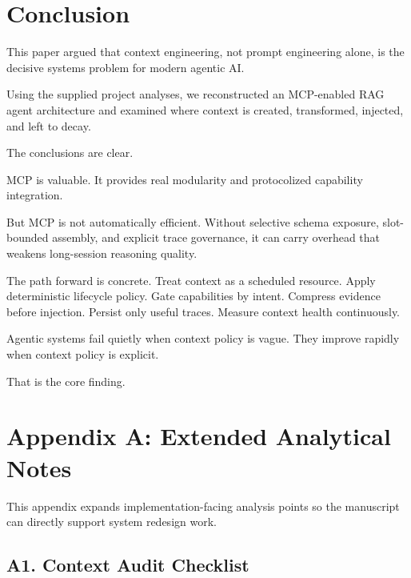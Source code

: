 \documentclass[conference]{IEEEtran}
\begin{document}
\section{Conclusion}
\label{sec:conclusion}

This paper argued that context engineering,
not prompt engineering alone,
is the decisive systems problem for modern agentic AI.

Using the supplied project analyses,
we reconstructed an MCP-enabled RAG agent architecture and examined where context is created,
transformed,
injected,
and left to decay.

The conclusions are clear.

MCP is valuable.
It provides real modularity and protocolized capability integration.

But MCP is not automatically efficient.
Without selective schema exposure,
slot-bounded assembly,
and explicit trace governance,
it can carry overhead that weakens long-session reasoning quality.

The path forward is concrete.
Treat context as a scheduled resource.
Apply deterministic lifecycle policy.
Gate capabilities by intent.
Compress evidence before injection.
Persist only useful traces.
Measure context health continuously.

Agentic systems fail quietly when context policy is vague.
They improve rapidly when context policy is explicit.

That is the core finding.

\section*{Appendix A: Extended Analytical Notes}

This appendix expands implementation-facing analysis points so the manuscript can directly support system redesign work.

\subsection*{A1. Context Audit Checklist}
\end{document}
